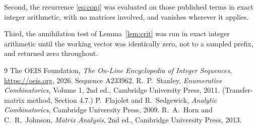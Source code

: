 \documentclass[11pt,a4paper]{article}
\theoremstyle{plain}
\theoremstyle{definition}
\begin{document}
Second, the recurrence \eqref{eq:conj} was evaluated on those published terms in exact
integer arithmetic, with no matrices involved, and vanishes wherever it applies.

Third, the annihilation test of Lemma~\ref{lem:crit} was run in exact integer arithmetic
until the working vector was identically zero, not to a sampled prefix, and returned zero
throughout.

\begin{thebibliography}{9}
 The OEIS Foundation, \emph{The On-Line Encyclopedia of Integer
Sequences}, \url{https://oeis.org}, 2026. Sequence A233962.
 R.~P.~Stanley, \emph{Enumerative Combinatorics}, Volume 1, 2nd ed.,
Cambridge University Press, 2011. (Transfer-matrix method, Section 4.7.)
 P.~Flajolet and R.~Sedgewick, \emph{Analytic Combinatorics}, Cambridge
University Press, 2009.
 R.~A.~Horn and C.~R.~Johnson, \emph{Matrix Analysis}, 2nd ed., Cambridge
University Press, 2013.
\end{thebibliography}
\end{document}
